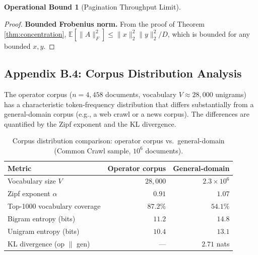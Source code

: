 \documentclass[10pt,twocolumn]{article}
\theoremstyle{definition}
\newtheorem{operationalbound}[theorem]{Operational Bound}
\theoremstyle{remark}
\begin{document}
\begin{operationalbound}[Pagination Throughput Limit]
\begin{proof}
\textbf{Bounded Frobenius norm.} From the proof of Theorem~
\ref{thm:concentration}, $\mathbb{E}[\|A\|_F^2] \le
\|x\|_2^2 \|y\|_2^2 / D$, which is bounded for any bounded $x, y$.
\qedhere
\end{proof}

\subsection{Appendix B.4: Corpus Distribution Analysis}
\label{app:corpus-distribution}

The operator corpus ($n = 4{,}458$ documents, vocabulary $V \approx
28{,}000$ unigrams) has a characteristic token-frequency distribution
that differs substantially from a general-domain corpus (e.g., a
web crawl or a news corpus). The differences are quantified by the
Zipf exponent and the KL divergence.

\begin{table}[h]
\centering
\caption{Corpus distribution comparison: operator corpus vs.\
general-domain (Common Crawl sample, $10^6$ documents).}
\label{tab:corpus-dist}
\begin{tabular}{lrr}
\hline
Metric & Operator corpus & General-domain \\
\hline
Vocabulary size $V$ & $28{,}000$ & $2.3 \times 10^6$ \\
Zipf exponent $\alpha$ & $0.91$ & $1.07$ \\
Top-1000 vocabulary coverage & $87.2\%$ & $54.1\%$ \\
Bigram entropy (bits) & $11.2$ & $14.8$ \\
Unigram entropy (bits) & $10.4$ & $13.1$ \\
KL divergence (op $\parallel$ gen) & --- & $2.71$ nats \\
\hline
\end{tabular}
\end{table}


\end{operationalbound}
\end{document}
